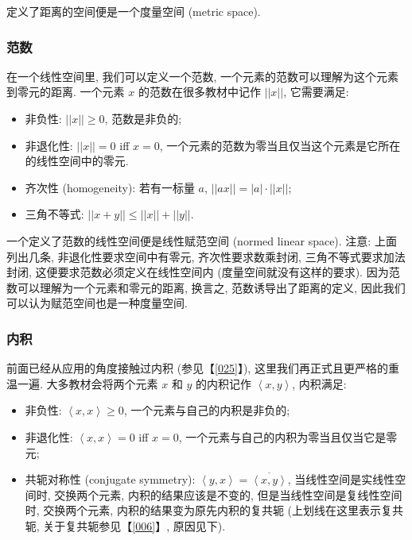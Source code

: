 定义了距离的空间便是一个度量空间 (metric space).


\subsubsection{范数}

在一个线性空间里, 我们可以定义一个范数,
一个元素的范数可以理解为这个元素到零元的距离. 一个元素 \(x\)
的范数在很多教材中记作 \(||x||\), 它需要满足:

\begin{itemize}
\item
  非负性: \(||x||\ge 0\), 范数是非负的;
\item
  非退化性: \(||x||=0\) iff \(x=0\),
  一个元素的范数为零当且仅当这个元素是它所在的线性空间中的零元.
\item
  齐次性 (homogeneity): 若有一标量 \(a\), \(||ax||=|a|\cdot||x||\);
\item
  三角不等式: \(||x+y||\le||x||+||y||\).
\end{itemize}

一个定义了范数的线性空间便是线性赋范空间 (normed linear space). 注意:
上面列出几条, 非退化性要求空间中有零元, 齐次性要求数乘封闭,
三角不等式要求加法封闭, 这便要求范数必须定义在线性空间内
(度量空间就没有这样的要求). 因为范数可以理解为一个元素和零元的距离,
换言之, 范数诱导出了距离的定义,
因此我们可以认为赋范空间也是一种度量空间.

\subsubsection{内积}

前面已经从应用的角度接触过内积 (参见【\ref{025}】),
这里我们再正式且更严格的重温一遍. 大多教材会将两个元素 \(x\) 和 \(y\)
的内积记作 \(\left<x,y\right>\), 内积满足:

\begin{itemize}
\item
  非负性: \(\left<x,x\right>\ge0\), 一个元素与自己的内积是非负的;
\item
  非退化性: \(\left<x,x\right>=0\) iff \(x=0\),
  一个元素与自己的内积为零当且仅当它是零元;
\item
  共轭对称性 (conjugate symmetry):
  \(\left<y,x\right>=\overline{\left<x,y\right>}\),
  当线性空间是实线性空间时, 交换两个元素, 内积的结果应该是不变的,
  但是当线性空间是复线性空间时, 交换两个元素,
  内积的结果变为原先内积的复共轭 (上划线在这里表示复共轭,
  关于复共轭参见【\ref{006}】, 原因见下).
\end{itemize}

